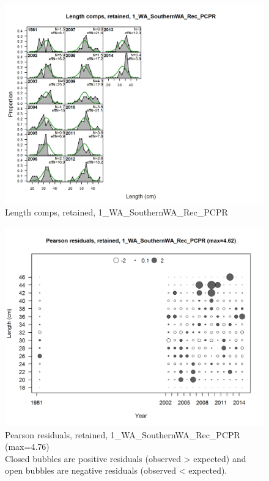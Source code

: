 \documentclass[12pt,]{article}
\begin{document}
\begin{figure}[htbp]
\centering
\includegraphics{./r4ss/plots_mod1/comp_lenfit_flt1mkt2.png}
\caption{Length comps, retained, 1\_WA\_SouthernWA\_Rec\_PCPR
\label{fig:mod1_1_comp_lenfit_flt1mkt2}}
\end{figure}

\begin{figure}[htbp]
\centering
\includegraphics{./r4ss/plots_mod1/comp_lenfit_residsflt1mkt2.png}
\caption{Pearson residuals, retained, 1\_WA\_SouthernWA\_Rec\_PCPR
(max=4.76)\\
Closed bubbles are positive residuals (observed \textgreater{} expected)
and open bubbles are negative residuals (observed \textless{} expected).
\label{fig:mod1_2_comp_lenfit_residsflt1mkt2}}
\end{figure}
\end{document}
